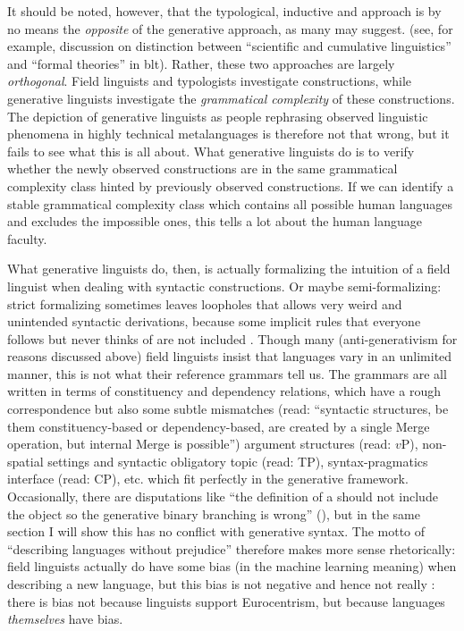 \documentclass[../main.tex]{subfiles}
\begin{document}
It should be noted, however, that the typological, inductive and  approach
is by no means the \emph{opposite} of the generative approach, as many may suggest.
(see, for example, discussion on distinction between 
``scientific and cumulative linguistics'' and ``formal theories'' in \ac{blt}). 
Rather, these two approaches are largely \emph{orthogonal}.
Field linguists and typologists investigate constructions,
while generative linguists investigate the \emph{grammatical complexity} of these constructions.
The depiction of generative linguists as 
people rephrasing observed linguistic phenomena in highly technical metalanguages \citep{haspelmath2021}
is therefore not that wrong, 
but it fails to see what this is all about.
What generative linguists do is to verify 
whether the newly observed constructions are in the same grammatical complexity class 
hinted by previously observed constructions.
If we can identify a stable grammatical complexity class 
which contains all possible human languages and excludes the impossible ones,
this tells a lot about the human language faculty.

What generative linguists do, then, is actually 
formalizing the intuition of a field linguist when dealing with syntactic constructions.
Or maybe semi-formalizing: strict formalizing sometimes leaves loopholes 
that allows very weird and unintended syntactic derivations,
because some implicit rules that everyone follows but never thinks of are not included \citep{whyformalize}.
Though many (anti-generativism for reasons discussed above) field linguists insist that 
languages vary in an unlimited manner, 
this is not what their reference grammars tell us.
The grammars are all written in terms of constituency and dependency relations, 
which have a rough correspondence but also some subtle mismatches 
(read: ``syntactic structures, be them constituency-based or dependency-based, 
are created by a single Merge operation, but internal Merge is possible'')
argument structures (read: $v$P), 
non-spatial settings and syntactic obligatory topic (read: TP),
syntax-pragmatics interface (read: CP), etc.
which fit perfectly in the generative framework. 
Occasionally, there are disputations like 
``the definition of a  should not include the object
so the generative binary branching is wrong'' 
(),
but in the same section I will show this has no conflict with generative syntax.
The motto of ``describing languages without prejudice'' therefore makes more sense rhetorically:
field linguists actually do have some bias (in the machine learning meaning) when describing a new language,
but this bias is not negative and hence not really :
there is bias not because linguists support Eurocentrism, but because languages \emph{themselves} have bias.
\end{document}

